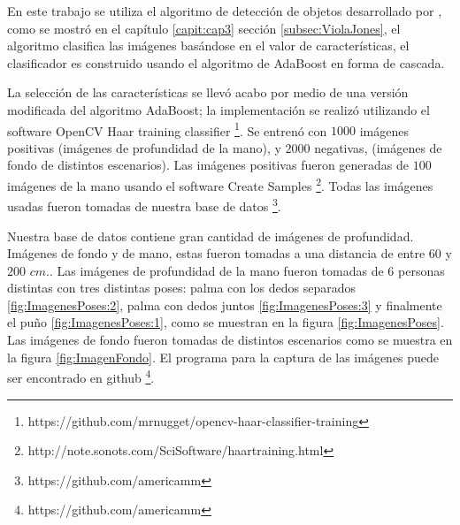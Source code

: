 En este trabajo se utiliza el algoritmo de detección de objetos desarrollado por \citep{Viola2001}, como se mostró en el cap\'itulo \ref{capit:cap3} sección \ref{subsec:ViolaJones}, el algoritmo clasifica las imágenes basándose en el valor de características, el clasificador es construido usando el algoritmo de AdaBoost en forma de cascada. 


La selección de las características se llev\'o acabo por medio de una versión modificada del algoritmo AdaBoost; la implementaci\'on se realiz\'o utilizando el software OpenCV Haar training classifier \footnote{https://github.com/mrnugget/opencv-haar-classifier-training}. Se entren\'o con $1000$ imágenes positivas (imágenes de profundidad de la mano), y $2000$ negativas, (imágenes de fondo de distintos escenarios). Las imágenes positivas fueron generadas de $100$ imágenes de la mano usando el software Create Samples \footnote{http://note.sonots.com/SciSoftware/haartraining.html}. Todas las imágenes usadas fueron tomadas de nuestra base de  datos \footnote{https://github.com/americamm}.

Nuestra base de datos contiene gran cantidad de imágenes de profundidad. Imágenes de fondo y de mano, estas fueron tomadas a una distancia de entre $60$ y $200$ $cm.$. Las imágenes de profundidad de la mano fueron tomadas de $6$ personas distintas con tres distintas poses: palma con los dedos separados \ref{fig:ImagenesPoses:2}, palma con dedos juntos \ref{fig:ImagenesPoses:3} y finalmente el pu\~no \ref{fig:ImagenesPoses:1}, como se muestran en la figura \ref{fig:ImagenesPoses}. Las imágenes de fondo fueron tomadas de distintos escenarios como se muestra en la figura \ref{fig:ImagenFondo}. El programa para la captura de las imágenes puede ser encontrado en github \footnote{https://github.com/americamm}.  

